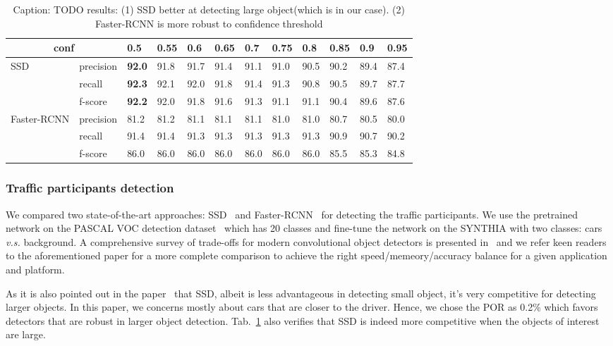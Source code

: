 \documentclass[10pt,twocolumn,letterpaper]{article}
\newcommand{\ra}[1]{\renewcommand{\arraystretch}{#1}}
\begin{document}
\begin{table}\centering
\ra{1.}
\begin{tabular}{@{}llllllllllll@{}}\toprule
\multicolumn{2}{c}{conf}  & 0.5  & 0.55 & 0.6 &  0.65 & 0.7  & 0.75 & 0.8 &  0.85 & 0.9  & 0.95\\
\hline
\multirow{3}{*}{SSD}&   precision & \textbf{92.0 } & 91.8 & 91.7 & 91.4 & 91.1 & 91.0 & 90.5 & 90.2 & 89.4 & 87.4\\
                    &    recall   & \textbf{92.3}  & 92.1 & 92.0 & 91.8 & 91.4 & 91.3 & 90.8 & 90.5 & 89.7 & 87.7\\
                    &    f-score  & \textbf{92.2 } & 92.0 & 91.8 & 91.6 & 91.3 & 91.1 & 91.1 & 90.4 & 89.6 & 87.6\\
\multirow{3}{*}{Faster-RCNN}
                    &   precision & 81.2  & 81.2  & 81.1 & 81.1 & 81.1 & 81.0 & 81.0 & 80.7 & 80.5 & 80.0 \\
                    &   recall    & 91.4  & 91.4  & 91.3 & 91.3 & 91.3 & 91.3 & 91.3 & 90.9 & 90.7 & 90.2\\
                    &   f-score   & 86.0  & 86.0  & 86.0 & 86.0 & 86.0 & 86.0 & 86.0 & 85.5 & 85.3 & 84.8\\
\bottomrule
\end{tabular}
\caption{Caption: TODO results: (1) SSD better at detecting large object(which is in our case). (2) Faster-RCNN  is more robust to confidence threshold}
\label{tab:ssd_fasterrcnn}
\end{table}
\subsubsection{Traffic participants detection}

We compared two state-of-the-art approaches: SSD~\cite{liu2016ssd} and Faster-RCNN~\cite{ren2015faster} for detecting the traffic participants.
We use the pretrained network on the PASCAL VOC detection dataset~\cite{everingham2015pascal} which has 20 classes and fine-tune the network on the SYNTHIA with two classes: cars \emph{v.s.} background.
A comprehensive survey of trade-offs for modern convolutional object detectors is presented in~\cite{huang2017speed} and we refer keen readers to the aforementioned paper for a more complete comparison to achieve the right speed/memeory/accuracy balance for a given application and platform.

As it is also pointed out in the paper~\cite{huang2017speed} that SSD, albeit is less advantageous in detecting small object, it's very competitive for detecting larger objects. In this paper, we concerns mostly about cars that are closer to the driver. Hence, we chose the POR as 0.2\% which favors detectors that are robust in larger object detection.
Tab.~\ref{tab:ssd_fasterrcnn} also verifies that SSD is indeed more competitive when the objects of interest are large.
\end{document}

